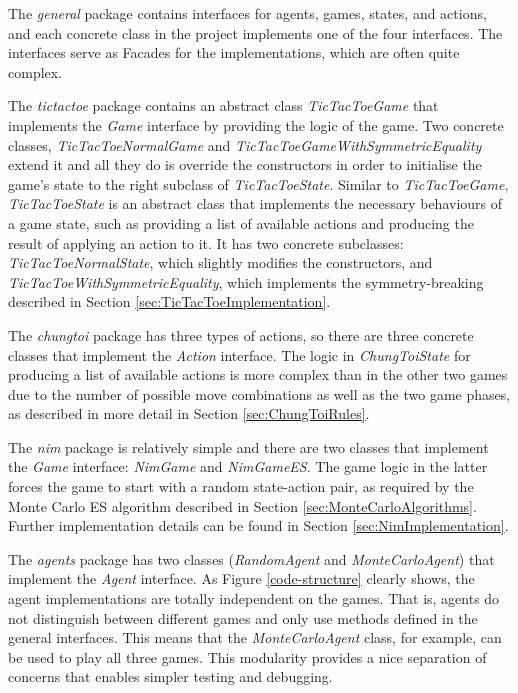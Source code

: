 \documentclass[11pt,a4paper]{report}
\begin{document}
The \emph{general} package contains interfaces for agents, games, states, and actions, and each concrete class in the project implements one of the four interfaces. The interfaces serve as Facades for the implementations, which are often quite complex.

The \emph{tictactoe} package contains an abstract class \emph{TicTacToeGame} that implements the \emph{Game} interface by providing the logic of the game. Two concrete classes, \emph{TicTacToeNormalGame} and \emph{TicTacToeGameWithSymmetricEquality} extend it and all they do is override the constructors in order to initialise the game's state to the right subclass of \emph{TicTacToeState}. Similar to \emph{TicTacToeGame}, \emph{TicTacToeState} is an abstract class that implements the necessary behaviours of a game state, such as providing a list of available actions and producing the result of applying an action to it. It has two concrete subclasses: \emph{TicTacToeNormalState}, which slightly modifies the constructors, and \emph{TicTacToeWithSymmetricEquality}, which implements the symmetry-breaking described in Section \ref{sec:TicTacToeImplementation}.

The \emph{chungtoi} package has three types of actions, so there are three concrete classes that implement the \emph{Action} interface. The logic in \emph{ChungToiState} for producing a list of available actions is more complex than in the other two games due to the number of possible move combinations as well as the two game phases, as described in more detail in Section \ref{sec:ChungToiRules}.

The \emph{nim} package is relatively simple and there are two classes that implement the \emph{Game} interface: \emph{NimGame} and \emph{NimGameES}. The game logic in the latter forces the game to start with a random state-action pair, as required by the Monte Carlo ES algorithm described in Section \ref{sec:MonteCarloAlgorithms}. Further implementation details can be found in Section \ref{sec:NimImplementation}.

The \emph{agents} package has two classes (\emph{RandomAgent} and \emph{MonteCarloAgent}) that implement the \emph{Agent} interface. As Figure \ref{code-structure} clearly shows, the agent implementations are totally independent on the games. That is, agents do not distinguish between different games and only use methods defined in the general interfaces. This means that the \emph{MonteCarloAgent} class, for example, can be used to play all three games. This modularity provides a nice separation of concerns that enables simpler testing and debugging.
\end{document}
